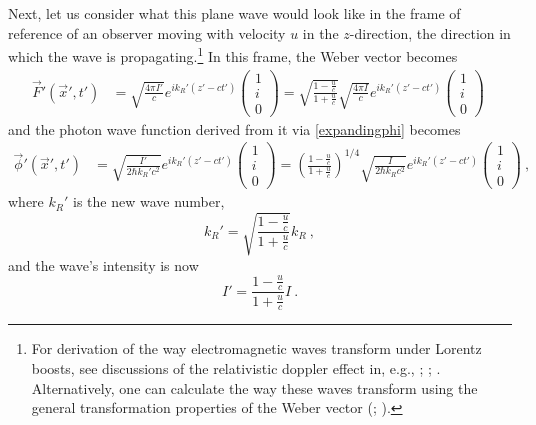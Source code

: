 \documentclass[12pt,secnumarabic,amsmath,amssymb,balancelastpage,nofootinbib]{article}
\begin{document}
Next, let us consider what this plane wave would look like in the frame of reference of an observer moving with velocity $u$ in the $z$-direction, the direction in which the wave is propagating.\footnote{For derivation of the way electromagnetic waves transform under Lorentz boosts, see discussions of the relativistic doppler effect in, e.g., \citet[sec.\ 7]{einstein1905}; \citet[prob.\ 12.47]{griffiths}; \citet[pg.\ 467--468]{pollackstump}.  Alternatively, one can calculate the way these waves transform using the general transformation properties of the Weber vector (\citealp[eq.\ 25.5]{landaulifshitzfields}; \citealp[sec.\ 35]{goodnelson1971}).}  In this frame, the Weber vector becomes
\begin{align}
\vec{F}'(\vec{x}',t') &= \sqrt{\frac{4 \pi I'}{c}} e^{i k_R' (z'-ct')}
\begin{pmatrix}
1 \\
i \\
0
\end{pmatrix}
= \sqrt{\frac{1-\frac{u}{c}}{1+\frac{u}{c}}}\sqrt{\frac{4 \pi I}{c}} e^{i k_R' (z'-ct')}
\begin{pmatrix}
1 \\
i \\
0
\end{pmatrix}
\label{WeberLTofplanewave}
\ 
\end{align}
and the photon wave function derived from it via \eqref{expandingphi} becomes
\begin{align}
\vec{\phi}'(\vec{x}',t') &= \sqrt{\frac{I'}{2 \hbar k_R' c^2}} e^{i k_R' (z'-ct')}\begin{pmatrix}
1 \\
i \\
0
\end{pmatrix}
= \left(\frac{1-\frac{u}{c}}{1+\frac{u}{c}}\right)^{1/4}\sqrt{\frac{I}{2 \hbar k_R c^2}} e^{i k_R' (z'-ct')}
\begin{pmatrix}
1 \\
i \\
0
\end{pmatrix}
\ ,
\label{phiLTofplanewave}
\end{align}
where $k_R'$ is the new wave number,
\begin{equation}
k_R'=\sqrt{\frac{1-\frac{u}{c}}{1+\frac{u}{c}}}k_R
\ ,
\label{kRLT}
\end{equation}
and the wave's intensity is now
\begin{equation}
I'=\frac{1-\frac{u}{c}}{1+\frac{u}{c}}I
\ .
\end{equation}
\end{document}
